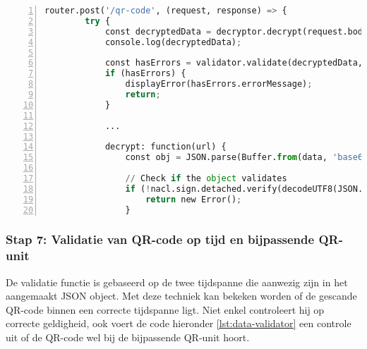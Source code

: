 \begin{lstlisting}[language=Python, caption={Python code om QR-code te verifieren op geldige digitale handtekening.}, label={lst:pythonVerifySigning}, numbers=left]
    router.post('/qr-code', (request, response) => {
        try {
            const decryptedData = decryptor.decrypt(request.body.tag);
            console.log(decryptedData);
            
            const hasErrors = validator.validate(decryptedData, Number(config.unit));
            if (hasErrors) {
                displayError(hasErrors.errorMessage);
                return;
            }
            
            ...
            
            decrypt: function(url) {
                const obj = JSON.parse(Buffer.from(data, 'base64').toString('utf8'));
                
                // Check if the object validates
                if (!nacl.sign.detached.verify(decodeUTF8(JSON.stringify(obj.d)), decodeBase64(obj.v), decodeBase64(publicKey))) {
                    return new Error();
                }
\end{lstlisting}

\subsubsection{Stap 7: Validatie van QR-code op tijd en bijpassende QR-unit}           
        
De validatie functie is gebaseerd op de twee tijdspanne die aanwezig zijn in het aangemaakt \ac{JSON} object. Met deze techniek kan bekeken worden of de gescande QR-code binnen een correcte tijdspanne ligt. Niet enkel controleert hij op correcte geldigheid, ook voert de code hieronder \ref{lst:data-validator} een controle uit of de QR-code wel bij de bijpassende QR-unit hoort.

